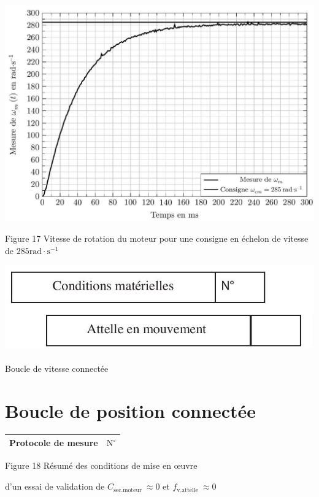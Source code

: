 \documentclass[10pt]{article}
\begin{document}
\begin{center}
\includegraphics[max width=\textwidth]{2024_07_14_a83aebba33898893d39fg-11(1)}
\end{center}

Figure 17 Vitesse de rotation du moteur pour une consigne en échelon de vitesse de $285 \mathrm{rad} \cdot \mathrm{s}^{-1}$

\includegraphics[max width=\textwidth]{2024_07_14_a83aebba33898893d39fg-11}$\qquad$\\
Boucle de vitesse connectée

\section*{Boucle de position connectée}
\begin{center}
\begin{tabular}{|l|l}
\hline
Protocole de mesure & $\mathrm{N}^{\circ}$ \\
\hline
\end{tabular}
\end{center}

Figure 18 Résumé des conditions de mise en œuvre

d'un essai de validation de $C_{\text {sec.moteur }} \approx 0$ et $f_{\text {v.attelle }} \approx 0$
\end{document}
